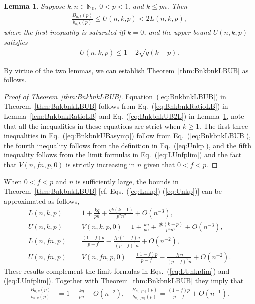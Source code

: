 \documentclass[aop]{imsart}
\theoremstyle{plain}
\newtheorem{lemma}[theorem]{Lemma}
\theoremstyle{remark}
\newcommand{\bbN}{\mathbb{N}}
\newcommand{\1}{\operatorname{\uppercase\expandafter{\romannumeral1}}}
\newcommand{\2}{\operatorname{\uppercase\expandafter{\romannumeral2}}}
\newcommand{\3}{\operatorname{\uppercase\expandafter{\romannumeral3}}}
\newcommand{\4}{\operatorname{\uppercase\expandafter{\romannumeral4}}}
\newcommand{\5}{\operatorname{\uppercase\expandafter{\romannumeral5}}}
\newcommand{\6}{\operatorname{\uppercase\expandafter{\romannumeral6}}}
\newcommand{\7}{\operatorname{\uppercase\expandafter{\romannumeral7}}}
\newcommand{\8}{\operatorname{\uppercase\expandafter{\romannumeral8}}}
\newcommand{\9}{\operatorname{\uppercase\expandafter{\romannumeral9}}}
\def\eqref#1{\textup{(\ref{#1})}}
\newcommand{\eref}[1]{Eq.~\textup{(\ref{#1})}}
\newcommand{\Eref}[1]{Equation~\textup{(\ref{#1})}}
\newcommand{\eqsref}[2]{Eqs.~(\ref{#1}) and (\ref{#2})}
\newcommand{\thref}[1]{Theorem~\ref{#1}}
\newcommand{\lref}[1]{Lemma~\ref{#1}}
\begin{document}
\begin{lemma}\label{lem:BnkbnkUB2L}
	Suppose $k,n\in \bbN_0$,  $0<p<1$, and $k\leq pn$.  Then 
	\begin{gather}
	\frac{B_{n,k}(p)}{b_{n,k}(p)}\leq U(n,k,p) < 2L(n,k,p),	\label{eq:BnkbnkUB2L}
\end{gather}
where the first inequality is saturated iff $k=0$, and the upper bound
$U(n,k,p)$ satisfies
\begin{gather}		
 U(n,k,p)\leq   1+2\sqrt{q (k+p)}. 	\label{eq:BnkbnkUB2L2}
\end{gather}
\end{lemma}



By virtue of  the two lemmas, we can establish \thref{thm:BnkbnkLBUB} as follows.
\begin{proof}[Proof of \thref{thm:BnkbnkLBUB}]
	\Eref{eq:BnkbnkLBUB} in Theorem~\ref{thm:BnkbnkLBUB} follows from 
	\eref{eq:BnkbnkRatioLB} in \lref{lem:BnkbnkRatioLB} and
	\eref{eq:BnkbnkUB2L} in  \lref{lem:BnkbnkUB2L}, note that all the inequalities in these equations are strict when $k\geq 1$. The first three inequalities in 
	\eref{eq:BnkbnkUBasymp} follow from \eref{eq:BnkbnkLBUB}, the fourth inequality follows from the definition in 
\eref{eq:Unkp}, and the fifth inequality follows from the limit formulas in \eref{eq:LUnfplim} and the fact  that $V(n,f n,p,0)$ is
strictly increasing in $n$ given that $0<f<p$.
\end{proof}



When $0<f<p$ and $n$ is sufficiently large, the bounds in \thref{thm:BnkbnkLBUB} [cf. Eqs.~\eqref{eq:Lnkp}-\eqref{eq:Unkp}] can be approximated as follows,
\begin{align}
L(n,k,p)&=1+\frac{kq }{p n}+\frac{q k(k-1)}{p^2 n^2}+O(n^{-3}),\\
U(n,k,p)&=V(n,k,p,0)=1+\frac{kq }{p n}+\frac{q k(k-p)}{p^2 n^2}+O(n^{-3}),\\
L(n,f n,p)&=\frac{(1-f)p}{p-f}-\frac{fp(1-f)q }{(p-f)^3n}+O(n^{-2}),\label{NM1}\\
U(n,f n,p)&=V(n,f n,p,0)=\frac{(1-f)p}{p-f}-\frac{fp q }{(p-f)^2n}+O(n^{-2}).\label{NM2}
\end{align}
These results complement the limit formulas in  \eqsref{eq:LUnkplim}{eq:LUnfplim}. Together with 
\thref{thm:BnkbnkLBUB} they imply that 
\begin{align}
\frac{B_{n,k}(p)}{b_{n,k}(p)}&=1+\frac{kq }{p n}+O(n^{-2}),\quad
\frac{B_{n,\lfloor fn\rfloor}(p)}{b_{n,\lfloor fn\rfloor}(p)}=\frac{(1-f)p}{p-f}+O(n^{-1}).
\end{align}
\end{document}
